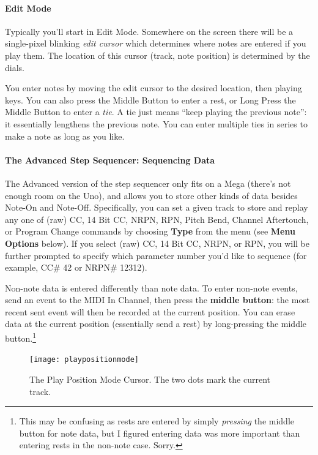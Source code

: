\documentclass{article}
\begin{document}
\paragraph{Edit Mode}
Typically you'll start in Edit Mode.  Somewhere on the screen there will be a single-pixel blinking {\it edit cursor} which determines where notes are entered if you play them.  The location of this cursor (track, note position) is determined by the dials.  

You enter notes by moving the edit cursor to the desired location, then playing keys.  You can also press the Middle Button to enter a rest, or Long Press the Middle Button to enter a {\it tie}.  A tie just means ``keep playing the previous note'': it essentially lengthens the previous note.  You can enter multiple ties in series to make a note as long as you like.

\paragraph{The Advanced Step Sequencer: Sequencing Data}  The Advanced version of the step sequencer only fits on a Mega (there's not enough room on the Uno), and allows you to store other kinds of data besides Note-On and Note-Off.  Specifically, you can set a given track to store and replay any one of (raw) CC, 14 Bit CC, NRPN, RPN, Pitch Bend, Channel Aftertouch, or Program Change commands by choosing {\bf Type} from the menu (see {\bf Menu Options} below).  If you select (raw) CC, 14 Bit CC, NRPN, or RPN, you will be further prompted to specify which parameter number you'd like to sequence (for example, CC\# 42 or NRPN\# 12312).

Non-note data is entered differently than note data.  To enter non-note events, send an event to the MIDI In Channel, then press the {\bf middle button}: the most recent sent event will then be recorded at the current position.  You can erase data at the current position (essentially send a rest) by long-pressing the middle button.\footnote{This may be confusing as rests are entered by simply {\it pressing} the middle button for note data, but I figured entering data was more important than entering rests in the non-note case.  Sorry.}

\begin{figure}
\vspace{-1.5em}\hspace{\fill}\texttt{[image: playpositionmode]}\hspace{\fill}%
\vspace{-1em}
\caption{\small The Play Position Mode Cursor.  The two dots mark the current track.}
\vspace{-1em}
\label{playpositionmode}
\end{figure}
\end{document}
